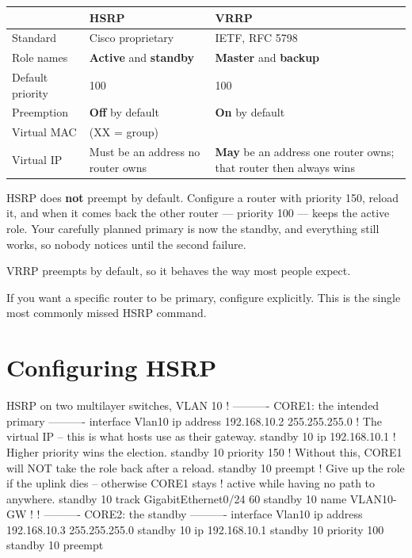 \begin{longtable}{@{}L{3.2cm}L{5.6cm}L{6.4cm}@{}}
\toprule
{}
\textbf{} & \textbf{HSRP} & \textbf{VRRP} \\
\midrule
\endhead
Standard & Cisco proprietary & IETF, RFC 5798 \\
Role names & \textbf{Active} and \textbf{standby} & \textbf{Master} and
\textbf{backup} \\
Default priority & 100 & 100 \\
Preemption & \textbf{Off} by default & \textbf{On} by default \\
Virtual MAC &  (XX = group) &
 \\
Virtual IP & Must be an address no router owns & \textbf{May} be an address one
router owns; that router then always wins \\
\bottomrule
\end{longtable}

\begin{alertbox}
HSRP does \textbf{not} preempt by default. Configure a router with priority 150,
reload it, and when it comes back the other router --- priority 100 --- keeps the
active role. Your carefully planned primary is now the standby, and everything
still works, so nobody notices until the second failure.

VRRP preempts by default, so it behaves the way most people expect.

If you want a specific router to be primary, configure 
explicitly. This is the single most commonly missed HSRP command.
\end{alertbox}

\section{Configuring HSRP}

\begin{config}{HSRP on two multilayer switches, VLAN 10}
! ---------- CORE1: the intended primary ----------
interface Vlan10
 ip address 192.168.10.2 255.255.255.0
 ! The virtual IP -- this is what hosts use as their gateway.
 standby 10 ip 192.168.10.1
 ! Higher priority wins the election.
 standby 10 priority 150
 ! Without this, CORE1 will NOT take the role back after a reload.
 standby 10 preempt
 ! Give up the role if the uplink dies -- otherwise CORE1 stays
 ! active while having no path to anywhere.
 standby 10 track GigabitEthernet0/24 60
 standby 10 name VLAN10-GW
!
! ---------- CORE2: the standby ----------
interface Vlan10
 ip address 192.168.10.3 255.255.255.0
 standby 10 ip 192.168.10.1
 standby 10 priority 100
 standby 10 preempt
\end{config}


